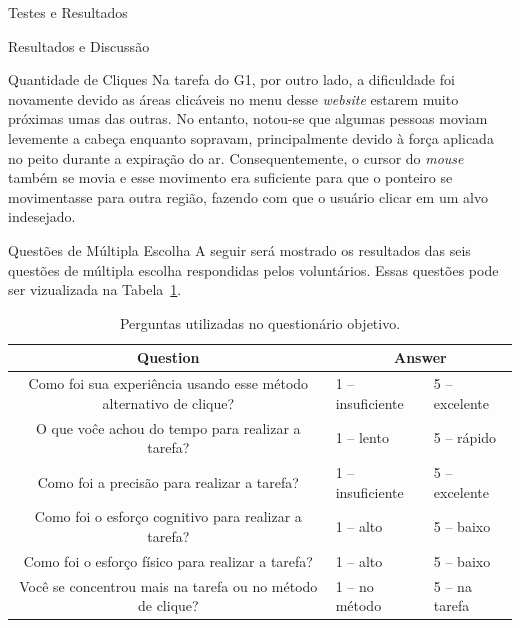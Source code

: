 \begin{chapter}{Testes e Resultados}
\begin{section}{Resultados e Discussão}
\begin{subsection}{Quantidade de Cliques}
Na tarefa do G1, por outro lado, a dificuldade foi novamente devido as áreas
clicáveis no menu desse \textit{website} estarem muito próximas umas das
outras. No entanto, notou-se que algumas pessoas moviam levemente a cabeça
enquanto sopravam, principalmente devido à força aplicada no peito durante a
expiração do ar. Consequentemente, o cursor do \textit{mouse} também se movia e
esse movimento era suficiente para que o ponteiro se movimentasse para outra
região, fazendo com que o usuário clicar em um alvo indesejado.
\end{subsection}

\begin{subsection}{Questões de Múltipla Escolha}
A seguir será mostrado os resultados das seis questões de múltipla escolha 
respondidas pelos voluntários. Essas questões pode ser vizualizada na
Tabela~\ref{tab:quest}.

\begin{table}[!h]
\centering
\small
\def\arraystretch{1.0}
\begin{tabular}{c|ll}
	\hline
	\hline
	 \textbf{Question} &\multicolumn{2}{c}{\textbf{Answer}} \\
	\hline
	 Como foi sua experiência usando esse método alternativo de clique? & 1 -- insuficiente        & 5 -- excelente   \\
	 O que voĉe achou do tempo para realizar a tarefa?                  & 1 -- lento               & 5 -- rápido      \\
	 Como foi a precisão para realizar a tarefa?                        & 1 -- insuficiente        & 5 -- excelente   \\
	 Como foi o esforço cognitivo para realizar a tarefa?               & 1 -- alto                & 5 -- baixo       \\
	 Como foi o esforço físico para realizar a tarefa?                  & 1 -- alto                & 5 -- baixo       \\
	 Você se concentrou mais na tarefa ou no método de clique?          & 1 -- no método           & 5 -- na tarefa   \\
	\hline
	\hline
\end{tabular}
\caption{Perguntas utilizadas no questionário objetivo.}
\label{tab:quest}
\end{table}


\end{subsection}
\end{section}
\end{chapter}

